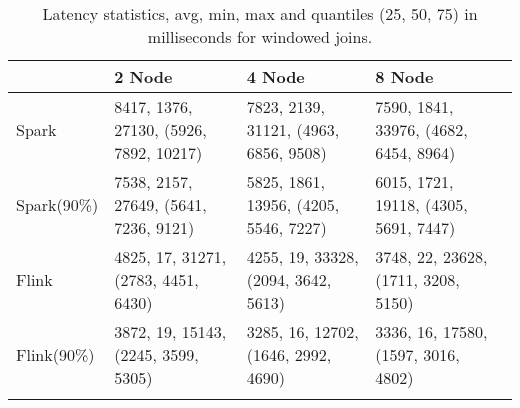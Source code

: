     \begin{table*}
        \begin{tabular}{lllll}\toprule
            &\textbf{2 Node}  & \textbf{4 Node} & \textbf{8 Node}\\\midrule
            Spark & 8417, 1376, 27130, (5926, 7892, 10217) & 7823, 2139, 31121, (4963, 6856, 9508) & 7590, 1841, 33976, (4682, 6454, 8964) \\
            Spark(90\%) & 7538, 2157, 27649, (5641, 7236, 9121) & 5825, 1861, 13956, (4205, 5546, 7227) & 6015, 1721, 19118, (4305, 5691, 7447)\\
            Flink & 4825, 17, 31271, (2783, 4451, 6430) & 4255, 19, 33328, (2094, 3642, 5613) & 3748, 22, 23628, (1711, 3208, 5150) \\
            Flink(90\%) & 3872, 19, 15143, (2245, 3599, 5305) & 3285, 16, 12702, (1646, 2992, 4690)  & 3336, 16, 17580, (1597, 3016, 4802) \\
            \\\bottomrule
        \end{tabular}
        \caption{Latency statistics, avg, min, max and quantiles (25, 50, 75) in milliseconds for windowed joins.}
                 \label{tab_lat_join}
    \end{table*} 
